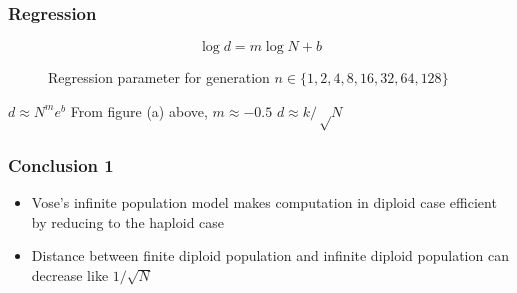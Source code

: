 \documentclass[aspectratio=169]{beamer}
\begin{document}
  \begin{frame}
    \frametitle{Regression}
    \[\log d = m \log N + b\]
    \begin{figure}[!ht]
      \begin{center}
	\hspace{5pt}
	\caption[]{Regression parameter for generation $n \in \{1, 2, 4, 8, 16, 32, 64, 128\}$ }	
      \end{center}
    \end{figure}
    $d \approx N^m e^b$
    \newline
    From figure (a) above, $m \approx -0.5$ 
    \newline
    $d \approx k / √N$
  \end{frame}  
  
  \begin{frame}
    \frametitle{Conclusion 1}
    \begin{itemize}
      \item{Vose's infinite population model makes computation in diploid case efficient by reducing to the haploid case}  
      \item{Distance between finite diploid population and infinite diploid population can decrease like $1/\sqrt{N}$}
    \end{itemize}
  \end{frame}
  
\end{document}
